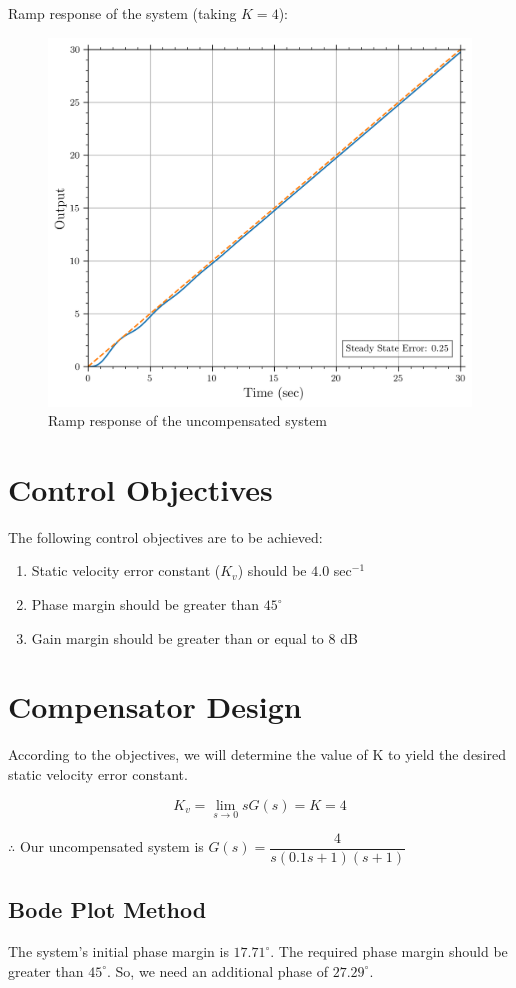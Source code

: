 \documentclass[12pt]{article}
\begin{document}
Ramp response of the system (taking $K=4$):
\begin{figure}[h!]
    \centering
    \includegraphics[width=0.7\linewidth]{ramp_response_uncompensated.png}
    \caption {Ramp response of the uncompensated system}
    \label{fig:ramp_uncompensated}
\end{figure}

\clearpage
\section{Control Objectives}
The following control objectives are to be achieved:
\begin{enumerate}
    \item Static velocity error constant ($K_v$) should be $4.0$ sec$^{-1}$
    \item Phase margin should be greater than $45^{\circ}$
    \item Gain margin should be greater than or equal to $8$ dB
\end{enumerate}

\section{Compensator Design}
According to the objectives, we will determine the value of K to yield the
desired static velocity error constant.

$$K_v = \lim_{s\to 0} sG(s) = K = 4$$

$\therefore$ Our uncompensated system is $G(s) = \dfrac{4}{s(0.1s+1)(s+1)}$

\subsection*{Bode Plot Method}
The system's initial phase margin is $17.71^\circ$. The required phase margin
should be greater than $45^\circ$. So, we need an additional phase of
$27.29^\circ$.
\end{document}
